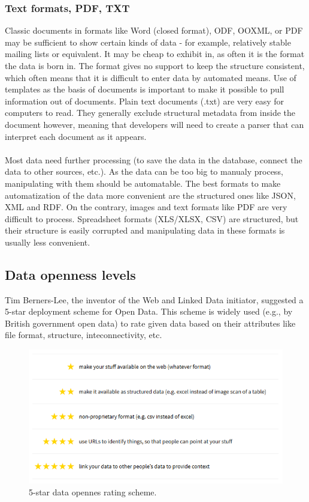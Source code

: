 \documentclass[thesis=B,english]{FITthesis}[2012/06/26]
\begin{document}
		\subsubsection{Text formats, PDF, TXT}
		Classic documents in formats like Word (closed format), ODF, OOXML, or PDF may be sufficient to show certain kinds of data - for example, relatively stable mailing lists or equivalent. It may be cheap to exhibit in, as often it is the format the data is born in. The format gives no support to keep the structure consistent, which often means that it is difficult to enter data by automated means. Use of templates as the basis of documents is important to make it possible to pull information out of documents.
Plain text documents (.txt) are very easy for computers to read. They generally exclude structural metadata from inside the document however, meaning that developers will need to create a parser that can interpret each document as it appears.
\paragraph{}Most data need further processing (to save the data in the database, connect the data to other sources, etc.). As the data can be too big to manualy process, manipulating with them should be automatable. The best formats to make automatization of the data more convenient are the structured ones like JSON, XML and RDF. On the contrary, images and text formats like PDF are very difficult to process. Spreadsheet formats (XLS/XLSX, CSV) are structured, but their structure is easily corrupted and manipulating data in these formats is usually less convenient.

	\subsection{Data openness levels}
	Tim Berners-Lee, the inventor of the Web and Linked Data initiator, suggested a 5-star deployment scheme for Open Data. This scheme is widely used (e.g., by British government open data) to rate given data based on their attributes like file format, structure, inteconnectivity, etc.
\begin{figure}[h!]
  \includegraphics[width=\linewidth]{pictures/5starRating.png}
  \caption{5-star data opennes rating scheme. \cite{5stardata}}
  \label{fig:5-star}
\end{figure}
\end{document}
